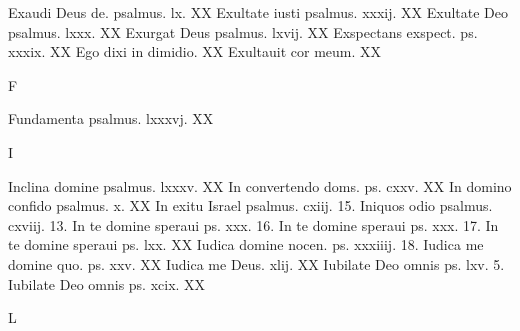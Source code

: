 \documentclass[a5paper,10pt]{book}
\begin{document}
\begin{multicols}{2}
\newline Exaudi Deus de. psalmus. lx. \hfill XX
\newline Exultate iusti psalmus. xxxij. \hfill XX
\newline Exultate Deo psalmus. lxxx. \hfill XX
\newline Exurgat Deus psalmus. lxvij. \hfill XX
\newline Exspectans exspect. ps. xxxix. \hfill XX
\newline Ego dixi in dimidio. \hfill XX
\newline Exultauit cor meum. \hfill XX
\newline \vspace{-1.75em}
\begin{center}
\color{red} F
\end{center}
\vspace{-.75em}
\par \noindent Fundamenta psalmus. lxxxvj. \hfill XX
\newline \vspace{-1.75em}
\begin{center}
\color{red} I
\end{center}
\vspace{-.75em}
\par \noindent Inclina domine psalmus. lxxxv. \hfill XX
\newline In convertendo doms. ps. cxxv. \hfill XX
\newline In domino confido psalmus. x. \hfill XX
\newline In exitu Israel psalmus. cxiij. \hfill 15.
\newline Iniquos odio psalmus. cxviij. \hfill 13.
\newline In te domine speraui ps. xxx. \hfill 16.
\newline In te domine speraui ps. xxx. \hfill 17.
\newline In te domine speraui ps. lxx. \hfill XX
\newline Iudica domine nocen. ps. xxxiiij. \hfill 18.
\newline Iudica me domine quo. ps. xxv. \hfill XX
\newline Iudica me Deus. xlij. \hfill XX
\newline Iubilate Deo omnis ps. lxv. \hfill 5.
\newline Iubilate Deo omnis ps. xcix. \hfill XX
\newline \vspace{-1.75em}
\begin{center}
\color{red} L

\end{center}
\end{multicols}
\end{document}
